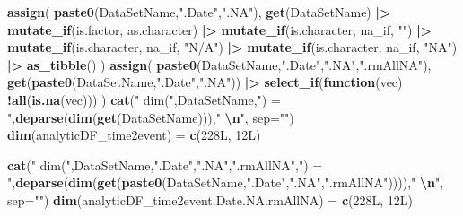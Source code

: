 \documentclass[
]{article}
\newenvironment{Shaded}{\begin{snugshade}}{\end{snugshade}}
\newcommand{\AttributeTok}[1]{\textcolor[rgb]{0.13,0.29,0.53}{#1}}
\newcommand{\ControlFlowTok}[1]{\textcolor[rgb]{0.13,0.29,0.53}{\textbf{#1}}}
\newcommand{\FunctionTok}[1]{\textcolor[rgb]{0.13,0.29,0.53}{\textbf{#1}}}
\newcommand{\NormalTok}[1]{#1}
\newcommand{\OtherTok}[1]{\textcolor[rgb]{0.56,0.35,0.01}{#1}}
\newcommand{\SpecialCharTok}[1]{\textcolor[rgb]{0.81,0.36,0.00}{\textbf{#1}}}
\newcommand{\StringTok}[1]{\textcolor[rgb]{0.31,0.60,0.02}{#1}}
\begin{document}
\begin{Shaded}
\begin{Highlighting}[]
\FunctionTok{assign}\NormalTok{( }\FunctionTok{paste0}\NormalTok{(DataSetName,}\StringTok{".Date"}\NormalTok{,}\StringTok{".NA"}\NormalTok{), }\FunctionTok{get}\NormalTok{(DataSetName) }\SpecialCharTok{|\textgreater{}} \FunctionTok{mutate\_if}\NormalTok{(is.factor, as.character) }\SpecialCharTok{|\textgreater{}} \FunctionTok{mutate\_if}\NormalTok{(is.character, na\_if, }\StringTok{""}\NormalTok{) }\SpecialCharTok{|\textgreater{}} \FunctionTok{mutate\_if}\NormalTok{(is.character, na\_if, }\StringTok{"N/A"}\NormalTok{) }\SpecialCharTok{|\textgreater{}} \FunctionTok{mutate\_if}\NormalTok{(is.character, na\_if, }\StringTok{"NA"}\NormalTok{) }\SpecialCharTok{|\textgreater{}} \FunctionTok{as\_tibble}\NormalTok{() )}
\FunctionTok{assign}\NormalTok{( }\FunctionTok{paste0}\NormalTok{(DataSetName,}\StringTok{".Date"}\NormalTok{,}\StringTok{".NA"}\NormalTok{,}\StringTok{".rmAllNA"}\NormalTok{), }\FunctionTok{get}\NormalTok{(}\FunctionTok{paste0}\NormalTok{(DataSetName,}\StringTok{".Date"}\NormalTok{,}\StringTok{".NA"}\NormalTok{)) }\SpecialCharTok{|\textgreater{}} \FunctionTok{select\_if}\NormalTok{(}\ControlFlowTok{function}\NormalTok{(vec) }\SpecialCharTok{!}\FunctionTok{all}\NormalTok{(}\FunctionTok{is.na}\NormalTok{(vec))) )}
\FunctionTok{cat}\NormalTok{(}\StringTok{" dim("}\NormalTok{,DataSetName,}\StringTok{") = "}\NormalTok{,}\FunctionTok{deparse}\NormalTok{(}\FunctionTok{dim}\NormalTok{(}\FunctionTok{get}\NormalTok{(DataSetName))),}\StringTok{"  }\SpecialCharTok{\textbackslash{}n}\StringTok{"}\NormalTok{, }\AttributeTok{sep=}\StringTok{""}\NormalTok{) }
 \FunctionTok{dim}\NormalTok{(analyticDF\_time2event) }\OtherTok{=} \FunctionTok{c}\NormalTok{(228L, 12L)  }
\end{Highlighting}
\end{Shaded}

\begin{Shaded}
\begin{Highlighting}[]
\FunctionTok{cat}\NormalTok{(}\StringTok{" dim("}\NormalTok{,DataSetName,}\StringTok{".Date"}\NormalTok{,}\StringTok{".NA"}\NormalTok{,}\StringTok{".rmAllNA"}\NormalTok{,}\StringTok{") = "}\NormalTok{,}\FunctionTok{deparse}\NormalTok{(}\FunctionTok{dim}\NormalTok{(}\FunctionTok{get}\NormalTok{(}\FunctionTok{paste0}\NormalTok{(DataSetName,}\StringTok{".Date"}\NormalTok{,}\StringTok{".NA"}\NormalTok{,}\StringTok{".rmAllNA"}\NormalTok{)))),}\StringTok{"  }\SpecialCharTok{\textbackslash{}n}\StringTok{"}\NormalTok{, }\AttributeTok{sep=}\StringTok{""}\NormalTok{) }
 \FunctionTok{dim}\NormalTok{(analyticDF\_time2event.Date.NA.rmAllNA) }\OtherTok{=} \FunctionTok{c}\NormalTok{(228L, 12L)  }
\end{Highlighting}
\end{Shaded}
\end{document}
